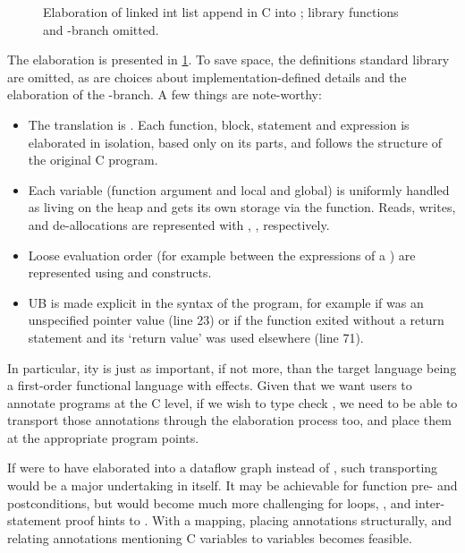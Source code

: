 \begin{figure}[p]
    \centering
    \begin{minipage}{1.2\textwidth}
    \end{minipage}
    \caption{Elaboration of linked int list append in C into
         ; library functions and -branch
        omitted.}\label{fig:append-core}
\end{figure}%

The elaboration is presented in \cref{fig:append-core}. To save space,
the definitions  standard library are omitted, as are choices about
implementation-defined details and the elaboration of the
-branch. A few things are note-worthy:
\begin{itemize}
    \item The translation is . Each function, block,
        statement and expression is elaborated in isolation, based only
        on its parts, and follows the structure of the original C program.
    \item Each variable (function argument and local and global) is uniformly
        handled as living on the heap and gets its own storage via the
         function. Reads, writes, and de-allocations are
        represented with , ,
         respectively.
    \item Loose evaluation order (for example between the expressions of a \cinline{==})
        are represented using  and  constructs.
    \item UB is made explicit in the syntax of the program, for example if  was
        an unspecified pointer value (line 23) or if the function exited without a return statement
        and its `return value' was used elsewhere (line 71).
\end{itemize}

In particular, ity is just as important, if not more, than the
target language being a first-order functional language with effects. Given
that we want users to annotate programs at the C level, if we wish to type
check , we need to be able to transport those annotations through the
elaboration process too, and place them at the appropriate program points.

If  were to have elaborated into a dataflow graph instead of ,
such transporting would be a major undertaking in itself. It may be achievable
for function pre- and postconditions, but would become much more challenging
for loops, , and inter-statement proof
hints to . With a  mapping, placing annotations
structurally, and relating annotations mentioning C variables to 
variables becomes feasible.

